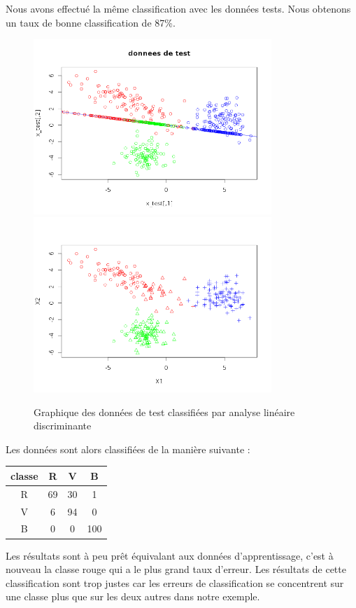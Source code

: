 \documentclass[a4paper,11pt]{article}
\begin{document}
  Nous avons effectué la même classification avec les données tests. Nous obtenons un taux de bonne classification
  de 87\%.
  
  \begin{figure}[H]
  \center
  \includegraphics[width=9cm]{test_acp.png}
   \includegraphics[width=9cm]{test_classifie.png}
   \caption{Graphique des données de test classifiées par analyse linéaire discriminante}
  \end{figure}
  
  Les données sont alors classifiées de la manière suivante :
  \begin{center}
  \begin{tabular}{|c|c|c|c|}
   \hline
   classe & R & V & B\\
   \hline
   R & 69 & 30 & 1 \\
   \hline
   V & 6 & 94 & 0 \\
   \hline
   B & 0 & 0 & 100 \\
   \hline
  \end{tabular}
  \end{center}
  
  Les résultats sont à peu prêt équivalant aux données d'apprentissage, c'est à nouveau la classe rouge
  qui a le plus grand taux d'erreur. Les résultats de cette classification sont trop justes car les erreurs
  de classification se concentrent sur une classe plus que sur les deux autres dans notre exemple.
  
\end{document}
